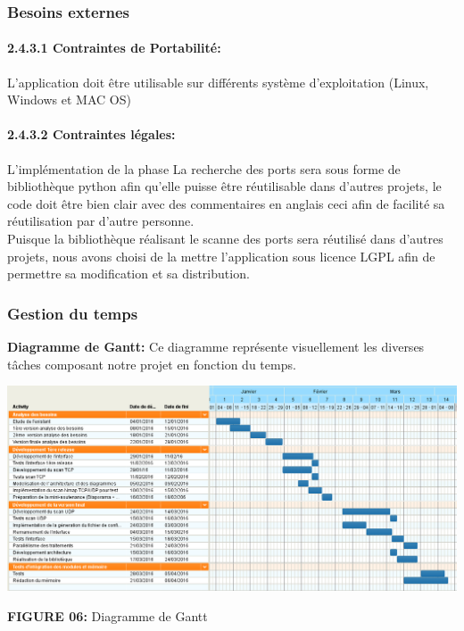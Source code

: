 \documentclass[12pt,a4paper]{article}
\begin{document}
\subsubsection{Besoins externes}

\paragraph{2.4.3.1 Contraintes de Portabilité: }
L’application doit être utilisable sur différents système d’exploitation (Linux, Windows et MAC OS)

\paragraph{2.4.3.2 Contraintes légales:}
L’implémentation de la phase La recherche des ports sera sous forme de bibliothèque python afin qu'elle puisse être réutilisable dans d'autres projets, le code doit être bien clair avec des commentaires en anglais ceci afin de facilité sa réutilisation par d’autre personne.\\

Puisque la bibliothèque réalisant le scanne des ports sera réutilisé dans d’autres projets, nous avons choisi de la mettre l’application sous licence LGPL afin de permettre sa modification et sa distribution.\\
\subsubsection{Gestion du temps}
\textbf{Diagramme de Gantt:}
Ce diagramme représente visuellement les diverses tâches composant notre projet en fonction du temps.
\begin{center}
{\textbf{FIGURE 06:} Diagramme de Gantt }
\end{center}
\end{document}

